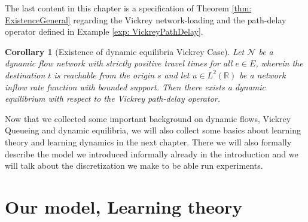 \documentclass[reqno,openany]{amsbook}
\theoremstyle{definition}
\theoremstyle{plain}
\newtheorem{corollary}[definition]{Corollary}
\begin{document}
The last content in this chapter is a specification of Theorem \ref{thm: ExistenceGeneral} regarding the Vickrey network-loading and the path-delay operator defined in Example \ref{exp: VickreyPathDelay}.

\begin{corollary}[Existence of dynamic equilibria Vickrey Case]
Let $\mathcal{N}$ be a dynamic flow network with strictly positive travel times for all $e \in E$, wherein the destination $t$ is reachable from the origin $s$ and let $u \in L^2(\mathbb{R})$ be a network inflow rate function with bounded support. Then there exists a dynamic equilibrium with respect to the Vickrey path-delay operator.
\end{corollary}

Now that we collected some important background on dynamic flows, Vickrey Queueing and dynamic equilibria, we will also collect some basics about learning theory and learning dynamics in the next chapter. There we will also formally describe the model we introduced informally already in the introduction and we will talk about the discretization we make to be able run experiments.






\chapter{Our model, Learning theory}
\end{document}
